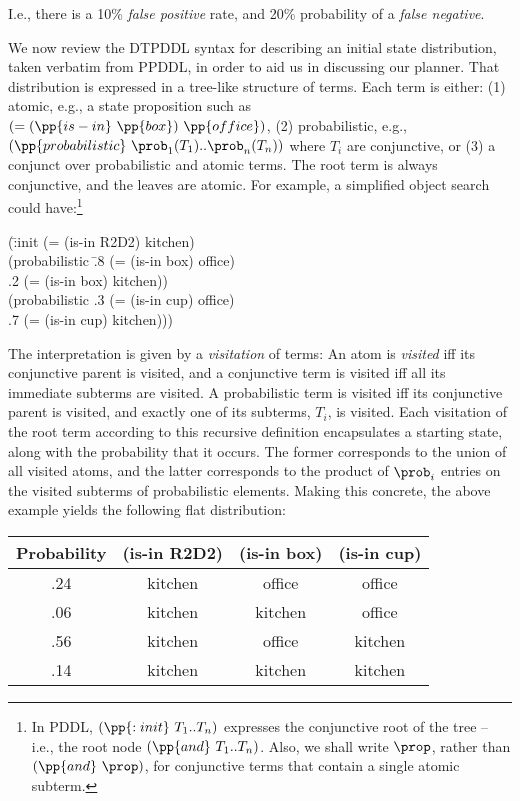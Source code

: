 \noindent I.e., there is a 10\% {\em false positive} rate, and 20\%
  probability of a {\em false negative}.

We now review the DTPDDL syntax for describing an initial state
distribution, taken verbatim from PPDDL, in order to aid us in
discussing our planner. That distribution is expressed in a tree-like
structure of terms. Each term is either: (1) atomic, e.g., a state
proposition such as $(=(\pp{is-in}~\pp{box})~\pp{office})$, (2)
probabilistic, e.g., $(\pp{probabilistic}~\prob_1 (T_1) .. \prob_n
(T_n))$ where $T_i$ are conjunctive, or (3) a conjunct over
probabilistic and atomic terms. The root term is always conjunctive,
and the leaves are atomic. For example, a simplified object search
could have:\footnote{In PDDL, $(\pp{:init}~T_1..T_n)$ expresses the
conjunctive root of the tree -- i.e., the root node
$(\pp{and}~T_1..T_n)$. Also, we shall write $\prop$, rather than
$(\pp{and}~\prop)$, for conjunctive terms that contain a single atomic
subterm.}

\vspace{-1ex}
\small
\begin{tabtt}
(\=:init (= (is-in R2D2) kitchen) \+ \\
       (probabilistic \=.8 (= (is-in box) office)  \\
		      \>.2 (= (is-in box) kitchen)) \\
       (probabilistic .3 (= (is-in cup) office)  \\
		      \>.7 (= (is-in cup) kitchen))) \\
\end{tabtt}
\normalsize

\vspace{-3ex}

\noindent The interpretation is given
by a {\em visitation} of terms: An atom is {\em visited} iff
its conjunctive parent is visited, and a conjunctive term is visited
iff all its immediate subterms are visited. A probabilistic term is
visited iff its conjunctive parent is visited, and exactly one of its
subterms, $T_i$, is visited. Each visitation of the root term
according to this recursive definition encapsulates a starting state,
along with the probability that it occurs. The former corresponds to the
union of all visited atoms, and the latter corresponds to the product
of $\prob_i$ entries on the visited subterms of probabilistic
elements. Making this concrete, the above example yields the
following flat distribution:


\small
\begin{tabular}{cccc}
\hline
Probability & (is-in R2D2)  & (is-in box)  & (is-in cup) \\
\hline
.24 & kitchen & office & office \\
.06 & kitchen & kitchen & office \\
.56 & kitchen & office & kitchen \\
.14 & kitchen & kitchen & kitchen \\
\hline
\end{tabular}
\normalsize




